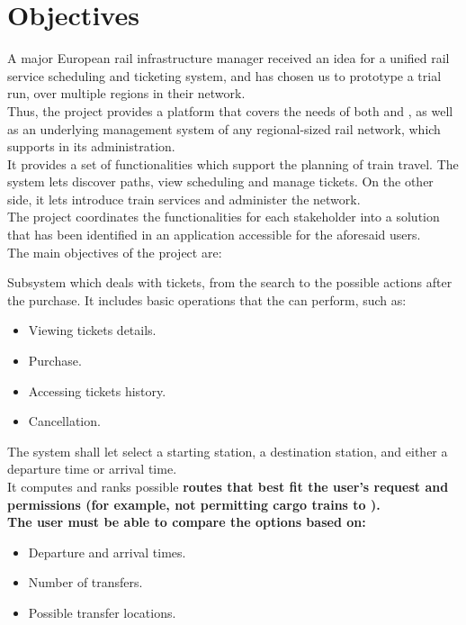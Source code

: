 \section{Objectives}

A major European rail infrastructure manager received an idea for a unified rail service scheduling and ticketing system, and has chosen us to prototype a trial run, over multiple regions in their network.\\

Thus, the project provides a platform that covers the needs of both  and , as well as an underlying 
management system of any regional-sized rail network, which supports  in its administration. \\
It provides a set of functionalities which support the planning of train travel. The system lets  discover paths, view scheduling and manage tickets. On the other side, it lets  introduce train services and  administer the network.\\
The project coordinates the functionalities for each stakeholder into a solution that has been identified in an application accessible for the aforesaid users. \\

\noindent The main objectives of the project are:

Subsystem which deals with tickets, from the search to the possible actions after the purchase. 
It includes basic operations that the  can perform, such as:
\begin{itemize}
	\item Viewing tickets details.
	\item Purchase.
	\item Accessing tickets history.
	\item Cancellation.
\end{itemize}


The system shall let  select a starting station, a destination station, and either a departure time or arrival time.\\
It computes and ranks possible \bf{routes} that best fit the user's request and permissions
(for example, not permitting cargo trains to ).\\
The user must be able to compare the options based on:
\begin{itemize}
    \item Departure and arrival times.
    \item Number of transfers.
    \item Possible transfer locations.
\end{itemize}

